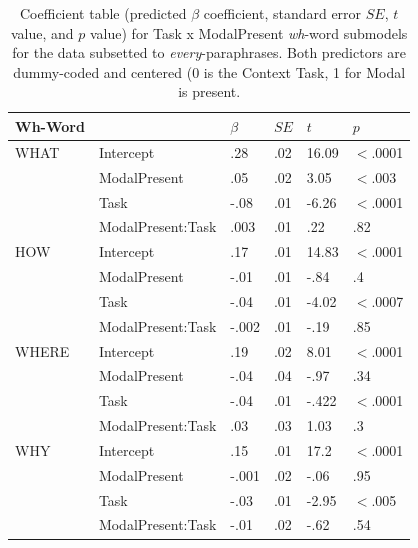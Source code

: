 \documentclass[12pt,letterpaper,table,svgnames,dvipsnames]{article}
\begin{document}
\begin{table}
\begin{center} 
\caption{Coefficient table (predicted $\beta$ coefficient, standard error $SE$, $t$ value, and $p$ value) for Task x ModalPresent \emph{wh}-word submodels for the data subsetted to \emph{every}-paraphrases. Both predictors are dummy-coded and centered (0 is the Context Task, 1 for Modal is present.} 
\label{sub-models_Task-every} 
\begin{tabular}{l|lllll} 
\toprule
Wh-Word & {} & $\beta$ & $SE$ & $t$ & $p$\\
\midrule
WHAT & Intercept & .28 & .02 & 16.09 & $<$.0001\\
{} & ModalPresent & .05 & .02 & 3.05 & $<$.003\\
{} & Task & -.08 & .01 & -6.26 & $<$.0001\\
{} & ModalPresent:Task & .003 & .01 & .22 & .82\\
\bottomrule
\toprule
HOW & Intercept & .17 & .01 & 14.83 & $<$.0001\\
{} & ModalPresent & -.01 & .01 & -.84 & .4\\
{} & Task & -.04 & .01 & -4.02 & $<$.0007\\
{} & ModalPresent:Task & -.002 & .01 & -.19 & .85\\
\toprule
WHERE & Intercept & .19 & .02 & 8.01 & $<$.0001\\
{} & ModalPresent & -.04 & .04 & -.97 & .34\\
{} & Task & -.04 & .01 & -.422 & $<$.0001\\
{} & ModalPresent:Task & .03 & .03 & 1.03 & .3\\
\bottomrule
\toprule
WHY & Intercept & .15 & .01 & 17.2 & $<$.0001\\
{} & ModalPresent & -.001 & .02 & -.06 & .95\\
{} & Task & -.03 & .01 & -2.95 & $<$.005\\
{} & ModalPresent:Task & -.01 & .02 & -.62 & .54\\

\end{tabular}
\end{center}
\end{table}
\end{document}

